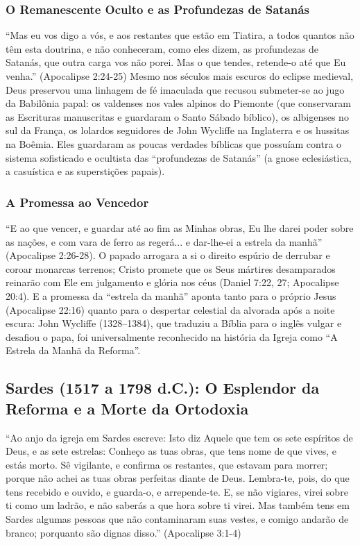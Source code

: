 \subsubsection*{O Remanescente Oculto e as Profundezas de Satanás}
``Mas eu vos digo a vós, e aos restantes que estão em Tiatira, a todos quantos não têm esta doutrina, e não conheceram, como eles dizem, as profundezas de Satanás, que outra carga vos não porei. Mas o que tendes, retende-o até que Eu venha.'' (Apocalipse 2:24-25)
Mesmo nos séculos mais escuros do eclipse medieval, Deus preservou uma linhagem de fé imaculada que recusou submeter-se ao jugo da Babilônia papal: os valdenses nos vales alpinos do Piemonte (que conservaram as Escrituras manuscritas e guardaram o Santo Sábado bíblico), os albigenses no sul da França, os lolardos seguidores de John Wycliffe na Inglaterra e os hussitas na Boêmia. Eles guardaram as poucas verdades bíblicas que possuíam contra o sistema sofisticado e ocultista das ``profundezas de Satanás'' (a gnose eclesiástica, a casuística e as superstições papais).


\subsubsection*{A Promessa ao Vencedor}
``E ao que vencer, e guardar até ao fim as Minhas obras, Eu lhe darei poder sobre as nações, e com vara de ferro as regerá... e dar-lhe-ei a estrela da manhã'' (Apocalipse 2:26-28). O papado arrogara a si o direito espúrio de derrubar e coroar monarcas terrenos; Cristo promete que os Seus mártires desamparados reinarão com Ele em julgamento e glória nos céus (Daniel 7:22, 27; Apocalipse 20:4). E a promessa da ``estrela da manhã'' aponta tanto para o próprio Jesus (Apocalipse 22:16) quanto para o despertar celestial da alvorada após a noite escura: John Wycliffe (1328–1384), que traduziu a Bíblia para o inglês vulgar e desafiou o papa, foi universalmente reconhecido na história da Igreja como ``A Estrela da Manhã da Reforma''.



\subsection{Sardes (1517 a 1798 d.C.): O Esplendor da Reforma e a Morte da Ortodoxia}


``Ao anjo da igreja em Sardes escreve: Isto diz Aquele que tem os sete espíritos de Deus, e as sete estrelas: Conheço as tuas obras, que tens nome de que vives, e estás morto. Sê vigilante, e confirma os restantes, que estavam para morrer; porque não achei as tuas obras perfeitas diante de Deus. Lembra-te, pois, do que tens recebido e ouvido, e guarda-o, e arrepende-te. E, se não vigiares, virei sobre ti como um ladrão, e não saberás a que hora sobre ti virei. Mas também tens em Sardes algumas pessoas que não contaminaram suas vestes, e comigo andarão de branco; porquanto são dignas disso.'' (Apocalipse 3:1-4)


